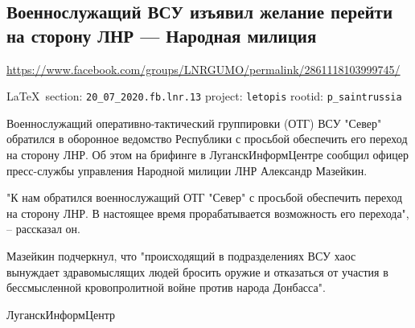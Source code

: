  
 

\subsection{Военнослужащий ВСУ изъявил желание перейти на сторону ЛНР --- Народная милиция}
\label{sec:20_07_2020.fb.lnr.13}
\url{https://www.facebook.com/groups/LNRGUMO/permalink/2861118103999745/}
  
\vspace{0.5cm}
{\small\LaTeX~section: \verb|20_07_2020.fb.lnr.13| project: \verb|letopis| rootid: \verb|p_saintrussia|}
\vspace{0.5cm}

Военнослужащий оперативно-тактический группировки (ОТГ) ВСУ "Север" обратился в
оборонное ведомство Республики с просьбой обеспечить его переход на сторону
ЛНР. Об этом на брифинге в ЛуганскИнформЦентре сообщил офицер пресс-службы
управления Народной милиции ЛНР Александр Мазейкин.

"К нам обратился военнослужащий ОТГ "Север" с просьбой обеспечить переход на
сторону ЛНР. В настоящее время прорабатывается возможность его перехода", –
рассказал он.

Мазейкин подчеркнул, что "происходящий в подразделениях ВСУ хаос вынуждает
здравомыслящих людей бросить оружие и отказаться от участия в бессмысленной
кровопролитной войне против народа Донбасса".

ЛуганскИнформЦентр
  
